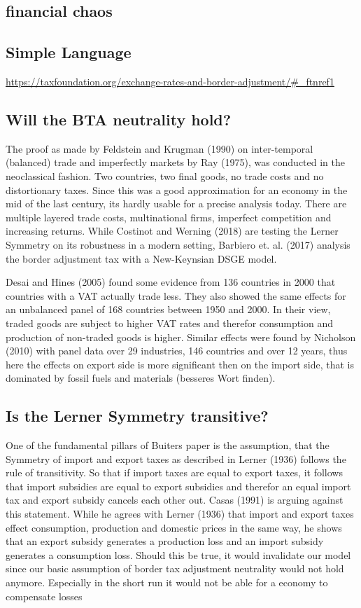 \subsection{financial chaos}
\subsection{Simple Language}
\url{https://taxfoundation.org/exchange-rates-and-border-adjustment/#_ftnref1}

\subsection{Will the BTA neutrality hold?}
The proof as made by Feldstein and Krugman (1990) on inter-temporal (balanced) trade and imperfectly markets by Ray (1975), was conducted in the neoclassical fashion. Two countries, two final goods, no trade costs and no distortionary taxes. Since this was a good approximation for an economy in the mid of the last century, its hardly usable for a precise analysis today. There are multiple layered trade costs, multinational firms, imperfect competition and increasing returns. While Costinot and Werning (2018) are testing the Lerner Symmetry on its robustness in a modern setting, Barbiero et. al. (2017) analysis the border adjustment tax with a New-Keynsian DSGE model. 

Desai and Hines (2005) found some evidence from 136 countries in 2000 that countries with a VAT actually trade less. They also showed the same effects for an unbalanced panel of 168 countries between 1950 and 2000. In their view, traded goods are subject to higher VAT rates and therefor consumption and production of non-traded goods is higher. Similar effects were found by Nicholson (2010) with panel data over 29 industries, 146 countries and over 12 years, thus here the effects on export side is more significant then on the import side, that is dominated by fossil fuels and materials (besseres Wort finden). 

\subsection{Is the Lerner Symmetry transitive?}
One of the fundamental pillars of Buiters paper is the assumption, that the Symmetry of import and export taxes as described in Lerner (1936) follows the rule of transitivity. So that if import taxes are equal to export taxes, it follows that import subsidies are equal to export subsidies and therefor an equal import tax and export subsidy cancels each other out. Casas (1991) is arguing against this statement. While he agrees with Lerner (1936) that import and export taxes effect consumption, production and domestic prices in the same way, he shows that an export subsidy generates a production loss and an import subsidy generates a consumption loss. Should this be true, it would invalidate our model since our basic assumption of border tax adjustment neutrality would not hold anymore. Especially in the short run it would not be able for a economy to compensate losses 

